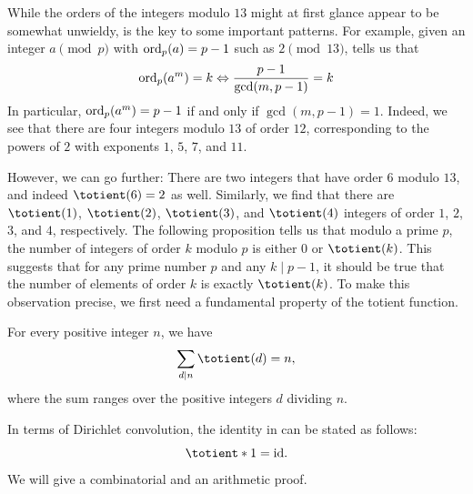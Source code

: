 While the orders of the integers modulo $13$ might at first glance appear to be somewhat unwieldy,  is the key to some important patterns. For example, given an integer $a\pmod{p}$ with $\operatorname{ord}_p(a)=p-1$ such as $2\pmod{13}$,  tells us that
\begin{equation*}
  \operatorname{ord}_p(a^m)=k \Leftrightarrow \frac{p-1}{\gcd(m,p-1)}=k
\end{equation*}
In particular, $\operatorname{ord}_p(a^m)=p-1$ if and only if $\gcd(m,p-1)=1$. Indeed, we see that there are four integers modulo $13$ of order $12$, corresponding to the powers of $2$ with exponents $1$, $5$, $7$, and $11$.

However, we can go further: There are two integers that have order $6$ modulo $13$, and indeed $\totient(6)=2$ as well. Similarly, we find that there are $\totient(1)$, $\totient(2)$, $\totient(3)$, and $\totient(4)$ integers of order $1$, $2$, $3$, and $4$, respectively. The following proposition tells us that modulo a prime $p$, the number of integers of order $k$ modulo $p$ is either $0$ or $\totient(k)$. This suggests that for any prime number $p$ and any $k\mid p-1$, it should be true that the number of elements of order $k$ is exactly $\totient(k)$. To make this observation precise, we first need a fundamental property of the totient function.

\begin{theorem}\label{theorem:dirichlet-convolution-phi}
  For every positive integer $n$, we have
  \begin{equation*}
    \sum_{d\mid n}\totient(d) = n,
  \end{equation*}
  where the sum ranges over the positive integers $d$ dividing $n$.
\end{theorem}

In terms of Dirichlet convolution, the identity in  can be stated as follows:
\begin{equation*}
  \totient\ast 1=\mathrm{id}.
\end{equation*}
We will give a combinatorial and an arithmetic proof.

